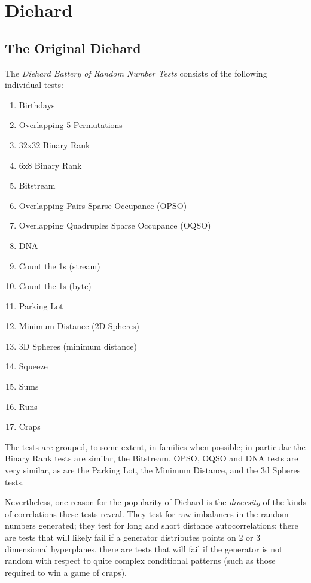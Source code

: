 \documentclass[12pt]{article}
\begin{document}
\section{Diehard}

\subsection{The Original Diehard}

The {\em Diehard Battery of Random Number Tests} consists of the
following individual tests:

\begin{enumerate}
 \item Birthdays 
 \item Overlapping 5 Permutations
 \item 32x32 Binary Rank 
 \item 6x8 Binary Rank 
 \item Bitstream 
 \item Overlapping Pairs Sparse Occupance (OPSO)
 \item Overlapping Quadruples Sparse Occupance (OQSO)
 \item DNA
 \item Count the 1s (stream) 
 \item Count the 1s (byte) 
 \item Parking Lot 
 \item Minimum Distance (2D Spheres) 
 \item 3D Spheres (minimum distance) 
 \item Squeeze 
 \item Sums 
 \item Runs 
 \item Craps
\end{enumerate} 
The tests are grouped, to some extent, in families when possible; in
particular the Binary Rank tests are similar, the Bitstream, OPSO, OQSO
and DNA tests are very similar, as are the Parking Lot, the Minimum
Distance, and the 3d Spheres tests.

Nevertheless, one reason for the popularity of Diehard is the {\em
diversity} of the kinds of correlations these tests reveal.  They test
for raw imbalances in the random numbers generated; they test for long
and short distance autocorrelations; there are tests that will likely
fail if a generator distributes points on 2 or 3 dimensional
hyperplanes, there are tests that will fail if the generator is not
random with respect to quite complex conditional patterns (such as those
required to win a game of craps).
\end{document}
